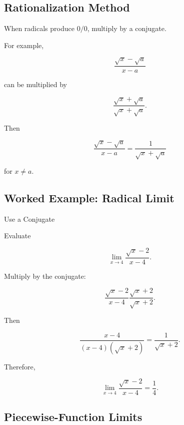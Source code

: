 \subsection{Rationalization Method}
\label{subsec:rationalization-limit-method}

When radicals produce \(0/0\), multiply by a conjugate.

For example,

\[
\frac{
\sqrt{x}-\sqrt a
}{
x-a
}
\]

can be multiplied by

\[
\frac{
\sqrt{x}+\sqrt a
}{
\sqrt{x}+\sqrt a
}.
\]

Then

\[
\boxed{
\frac{
\sqrt{x}-\sqrt a
}{
x-a
}
=
\frac{
1
}{
\sqrt{x}+\sqrt a
}
}
\]

for \(x\neq a\).

\subsection{Worked Example: Radical Limit}
\label{subsec:worked-radical-limit}

\begin{workedexamplebox}{Use a Conjugate}

Evaluate

\[
\lim_{x\to4}
\frac{
\sqrt{x}-2
}{
x-4
}.
\]

Multiply by the conjugate:

\[
\frac{
\sqrt{x}-2
}{
x-4
}
\frac{
\sqrt{x}+2
}{
\sqrt{x}+2
}.
\]

Then

\[
\frac{
x-4
}{
(x-4)(\sqrt{x}+2)
}
=
\frac{
1
}{
\sqrt{x}+2
}.
\]

Therefore,

\begin{answerbox}
\[
\boxed{
\lim_{x\to4}
\frac{
\sqrt{x}-2
}{
x-4
}
=
\frac14.
}
\]
\end{answerbox}

\end{workedexamplebox}

\subsection{Piecewise-Function Limits}
\label{subsec:piecewise-limit-reference}

